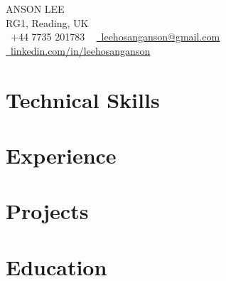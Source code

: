 



\begin{center}
    {\large \scshape ANSON LEE} \\
    \vspace{1pt}
    RG1, Reading, UK \\
    \vspace{1pt}
    \small \faPhone\ +44 7735 201783
    ~ \href{mailto:leehosanganson@gmail.com}{\faEnvelope\  \underline{leehosanganson@gmail.com}}
    ~ \href{https://www.linkedin.com/in/leehosanganson}{\faLinkedin\ \underline{linkedin.com/in/leehosanganson}}
\end{center}
\vspace{-14pt}

\section{Technical Skills}

\vspace{-16pt}

\section{Experience}

\vspace{-16pt}

\section{Projects}

\vspace{-16pt}

\section{Education}


